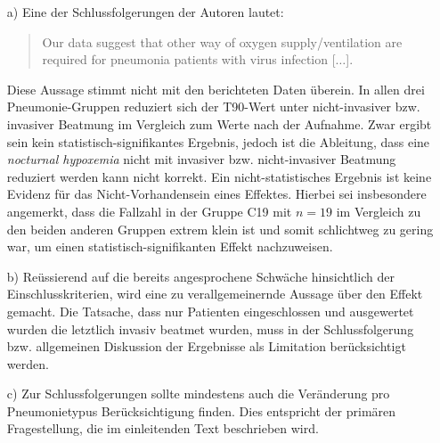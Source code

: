 \documentclass{scrartcl}
\theoremstyle{definition}
\theoremstyle{remark}
\begin{document}
\begin{enumerate}
	\item[a) ]Eine der Schlussfolgerungen der Autoren lautet:
		\begin{quotation}
		Our data suggest that other way of oxygen supply/ventilation are required for pneumonia patients with virus infection [$\ldots$].
	\end{quotation}
			  Diese Aussage stimmt nicht mit den berichteten Daten überein. In allen drei Pneumonie-Gruppen reduziert sich der T90-Wert unter nicht-invasiver bzw. invasiver Beatmung im Vergleich zum Werte nach der Aufnahme. Zwar ergibt sein kein statistisch-signifikantes Ergebnis, jedoch ist die Ableitung, dass eine \textit{nocturnal hypoxemia} nicht mit invasiver bzw. nicht-invasiver Beatmung reduziert werden kann nicht korrekt. Ein nicht-statistisches Ergebnis ist keine Evidenz für das Nicht-Vorhandensein eines Effektes. Hierbei sei insbesondere angemerkt, dass die Fallzahl in der Gruppe C19 mit $n=19$ im Vergleich zu den beiden anderen Gruppen extrem klein ist und somit schlichtweg zu gering war, um einen statistisch-signifikanten Effekt nachzuweisen.
	 \item[b) ]Reüssierend auf die bereits angesprochene Schwäche hinsichtlich der Einschlusskriterien, wird eine zu verallgemeinernde Aussage über den Effekt gemacht. Die Tatsache, dass nur Patienten eingeschlossen und ausgewertet wurden die letztlich invasiv beatmet wurden, muss in der Schlussfolgerung bzw. allgemeinen Diskussion der Ergebnisse als Limitation berücksichtigt werden. 
	 \item[c) ]Zur Schlussfolgerungen sollte mindestens auch die Veränderung pro Pneumonietypus Berücksichtigung finden. Dies entspricht der primären Fragestellung, die im einleitenden Text beschrieben wird. 
\end{enumerate}



%

%
%

\end{document}
